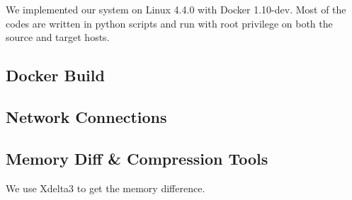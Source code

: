 

We implemented our system on Linux 4.4.0 with Docker 1.10-dev. Most of the codes are written in python scripts and run with root privilege on both the source and target hosts.

\subsection{Docker Build}

\subsection{Network Connections}

\subsection{Memory Diff \& Compression Tools
}

We use Xdelta3 to get the memory difference.